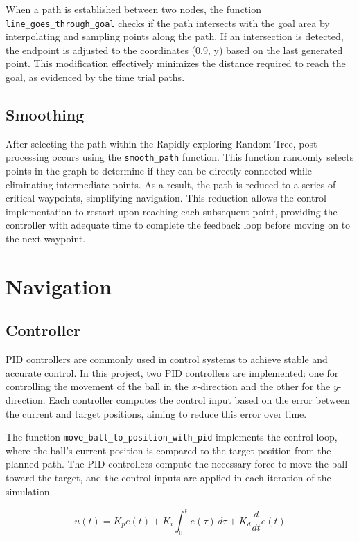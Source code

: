 \documentclass[12pt]{article}
\begin{document}
When a path is established between two nodes, the function \texttt{line\_goes\_through\_goal} checks if the path intersects with the goal area by interpolating and sampling points along the path. If an intersection is detected, the endpoint is adjusted to the coordinates (0.9, y) based on the last generated point. This modification effectively minimizes the distance required to reach the goal, as evidenced by the time trial paths.

\subsection{Smoothing}
After selecting the path within the Rapidly-exploring Random Tree, post-processing occurs using the \texttt{smooth\_path} function. This function randomly selects points in the graph to determine if they can be directly connected while eliminating intermediate points. As a result, the path is reduced to a series of critical waypoints, simplifying navigation. This reduction allows the control implementation to restart upon reaching each subsequent point, providing the controller with adequate time to complete the feedback loop before moving on to the next waypoint.

\section{Navigation}

\subsection{Controller}
PID controllers are commonly used in control systems to achieve stable and accurate control. In this project, two PID controllers are implemented: one for controlling the movement of the ball in the \(x\)-direction and the other for the \(y\)-direction. Each controller computes the control input based on the error between the current and target positions, aiming to reduce this error over time.

The function \texttt{move\_ball\_to\_position\_with\_pid} implements the control loop, where the ball’s current position is compared to the target position from the planned path. The PID controllers compute the necessary force to move the ball toward the target, and the control inputs are applied in each iteration of the simulation.

\begin{equation}
u(t) = K_p e(t) + K_i \int_0^t e(\tau) \, d\tau + K_d \frac{d}{dt} e(t)
\end{equation}
\end{document}
